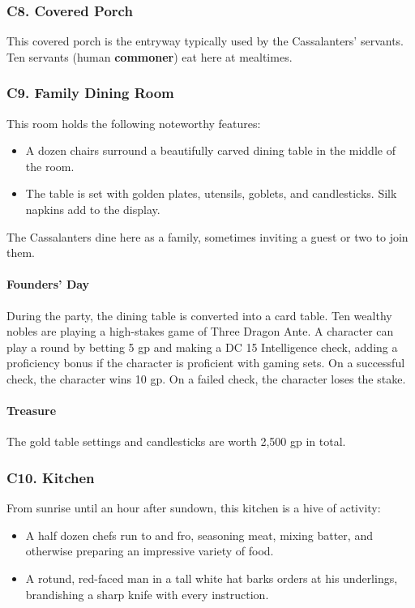 \documentclass[10pt,a4paper,twoside,twocolumn,openany,nodeprecatedcode]{dndbook}
\begin{document}
\subsubsection{C8. Covered Porch}
This covered porch is the entryway typically used by the Cassalanters' servants. Ten servants (human \textbf{commoner}) eat here at mealtimes.
\subsubsection{C9. Family Dining Room}
This room holds the following noteworthy features:
\begin{itemize}

\item A dozen chairs surround a beautifully carved dining table in the middle of the room.
\item The table is set with golden plates, utensils, goblets, and candlesticks. Silk napkins add to the display.
\end{itemize}


The Cassalanters dine here as a family, sometimes inviting a guest or two to join them.
\paragraph{Founders' Day}
During the party, the dining table is converted into a card table. Ten wealthy nobles are playing a high-stakes game of Three Dragon Ante. A character can play a round by betting 5 gp and making a DC 15 Intelligence check, adding a proficiency bonus if the character is proficient with gaming sets. On a successful check, the character wins 10 gp. On a failed check, the character loses the stake.
\paragraph{Treasure}
The gold table settings and candlesticks are worth 2,500 gp in total.
\subsubsection{C10. Kitchen}
From sunrise until an hour after sundown, this kitchen is a hive of activity:
\begin{itemize}

\item A half dozen chefs run to and fro, seasoning meat, mixing batter, and otherwise preparing an impressive variety of food.
\item A rotund, red-faced man in a tall white hat barks orders at his underlings, brandishing a sharp knife with every instruction.
\end{itemize}
\end{document}
